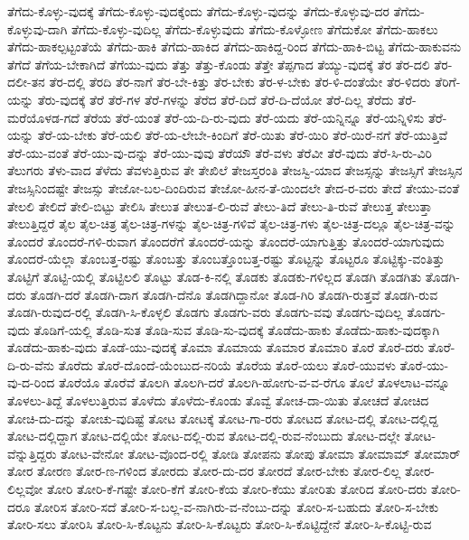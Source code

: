 {ತೆಗೆದು-ಕೊಳ್ಳು-ವುದಕ್ಕೆ
ತೆಗೆದು-ಕೊಳ್ಳು-ವುದಕ್ಕೆಂದು
ತೆಗೆದು-ಕೊಳ್ಳು-ವುದನ್ನು
ತೆಗೆದು-ಕೊಳ್ಳುವು-ದರ
ತೆಗೆದು-ಕೊಳ್ಳುವು-ದಾಗಿ
ತೆಗೆದು-ಕೊಳ್ಳು-ವುದಿಲ್ಲ
ತೆಗೆದು-ಕೊಳ್ಳುವುದು
ತೆಗೆದು-ಕೊಳ್ಳೋಣ
ತೆಗೆದುಕೋ
ತೆಗೆದು-ಹಾಕಲು
ತೆಗೆದು-ಹಾಕಲ್ಪಟ್ಟಂತೆಯೆ
ತೆಗೆದು-ಹಾಕಿ
ತೆಗೆದು-ಹಾಕಿದ
ತೆಗೆದು-ಹಾಕಿದ್ದ-ರಿಂದ
ತೆಗೆದು-ಹಾಕಿ-ಬಿಟ್ಟ
ತೆಗೆದು-ಹಾಕುವನು
ತೆಗೆದೆ
ತೆಗೆಯ-ಬೇಕಾಗಿದೆ
ತೆಗೆಯು-ವುದು
ತೆತ್ತು
ತೆತ್ತು-ಕೊಂಡು
ತೆತ್ತೇ
ತೆಪ್ಪಗಾದ
ತೆಯ್ಯು-ವುದಕ್ಕೆ
ತೆರ
ತೆರ-ದಲಿ
ತೆರ-ದಲೀ-ತನ
ತೆರ-ದಲ್ಲಿ
ತೆರದಿ
ತೆರ-ನಾಗೆ
ತೆರ-ಬೇ-ಕಿತ್ತು
ತೆರ-ಬೇಕು
ತೆರ-ಳ-ಬೇಕು
ತೆರ-ಳಿ-ದಂತೆಯೇ
ತೆರ-ಳಿದರು
ತೆರಿಗೆ-ಯನ್ನು
ತೆರು-ವುದಕ್ಕೆ
ತೆರೆ
ತೆರೆ-ಗಳ
ತೆರೆ-ಗಳನ್ನು
ತೆರೆದ
ತೆರೆ-ದಿದೆ
ತೆರೆ-ದಿ-ದೆಯೋ
ತೆರೆ-ದಿಲ್ಲ
ತೆರೆದು
ತೆರೆ-ಮರೆಯೊಳಡ-ಗದೆ
ತೆರೆಯ
ತೆರೆ-ಯಂತೆ
ತೆರೆ-ಯ-ದಿ-ರು-ವುದು
ತೆರೆ-ಯದು
ತೆರೆ-ಯನ್ನಿನ್ನೂ
ತೆರೆ-ಯನ್ನಿಳಿಸು
ತೆರೆ-ಯನ್ನು
ತೆರೆ-ಯ-ಬೇಕು
ತೆರೆ-ಯಲಿ
ತೆರೆ-ಯ-ಲೇಬೇ-ಕಿಂದಿಗೆ
ತೆರೆ-ಯಿತು
ತೆರೆ-ಯಿರಿ
ತೆರೆ-ಯಿರೆ-ನಗೆ
ತೆರೆ-ಯುತ್ತಿವೆ
ತೆರೆ-ಯು-ವಂತೆ
ತೆರೆ-ಯು-ವು-ದನ್ನು
ತೆರೆ-ಯು-ವುವು
ತೆರೆಯೌ
ತೆರೆ-ವಳು
ತೆರೆವೀ
ತೆರೆ-ವುದು
ತೆರೆ-ಸಿ-ರು-ವಿರಿ
ತೆಲುಗರು
ತೆಳು-ವಾದ
ತೆಳೆದು
ತೆವಳುತ್ತಿರುವ
ತೇ
ತೇಖಿಲೆ
ತೇಜಸ್ತರಂತಿ
ತೇಜಸ್ವಿ-ಯಾದ
ತೇಜಸ್ಸನ್ನು
ತೇಜಸ್ಸಿಗೆ
ತೇಜಸ್ಸಿನ
ತೇಜಸ್ಸಿನಿಂದಷ್ಟೇ
ತೇಜಸ್ಸು
ತೇಜೋ-ಬಲ-ದಿಂದಿರುವ
ತೇಜೋ-ಹೀನ-ತೆ-ಯಿಂದಲೇ
ತೇದ-ರ-ವರು
ತೇದೆ
ತೇಯು-ವಂತೆ
ತೇಲಲಿ
ತೇಲಿದೆ
ತೇಲಿ-ಬಿಟ್ಟು
ತೇಲಿಸಿ
ತೇಲುತ
ತೇಲುತ-ಲಿ-ರುವೆ
ತೇಲು-ತಿದೆ
ತೇಲು-ತಿ-ರುವೆ
ತೇಲುತ್ತ
ತೇಲುತ್ತಾ
ತೇಲುತ್ತಿದ್ದರೆ
ತೈಲ
ತೈಲ-ಚಿತ್ರ
ತೈಲ-ಚಿತ್ರ-ಗಳನ್ನು
ತೈಲ-ಚಿತ್ರ-ಗಳಿವೆ
ತೈಲ-ಚಿತ್ರ-ಗಳು
ತೈಲ-ಚಿತ್ರ-ದಲ್ಲೂ
ತೈಲ-ಚಿತ್ರ-ವನ್ನು
ತೊಂದರೆ
ತೊಂದರೆ-ಗಳಿ-ರುವಾಗ
ತೊಂದರೆಗೆ
ತೊಂದರೆ-ಯನ್ನು
ತೊಂದರೆ-ಯಾಗುತ್ತಿತ್ತು
ತೊಂದರೆ-ಯಾಗುವುದು
ತೊಂದರೆ-ಯೆಲ್ಲಾ
ತೊಂಬತ್ತ-ರಷ್ಟು
ತೊಂಬತ್ತು
ತೊಂಬತ್ತೊಂಬತ್ತ-ರಷ್ಟು
ತೊಟ್ಟನ್ನು
ತೊಟ್ಟರೂ
ತೊಟ್ಟಿಕ್ಕು-ವಂತಿತ್ತು
ತೊಟ್ಟಿಗೆ
ತೊಟ್ಟಿ-ಯಲ್ಲಿ
ತೊಟ್ಟಿಲಲಿ
ತೊಟ್ಟು
ತೊಡ-ಕಿ-ನಲ್ಲಿ
ತೊಡಕು
ತೊಡಕು-ಗಳಿಲ್ಲದ
ತೊಡಗಿ
ತೊಡಗಿತು
ತೊಡಗಿ-ದರು
ತೊಡಗಿ-ದರೆ
ತೊಡಗಿ-ದಾಗ
ತೊಡಗಿ-ದೆನೊ
ತೊಡಗಿದ್ದಾನೋ
ತೊಡ-ಗಿರಿ
ತೊಡಗಿ-ರುತ್ತವೆ
ತೊಡಗಿ-ರುವ
ತೊಡಗಿ-ರುವುದ-ರಲ್ಲಿ
ತೊಡಗಿ-ಸಿ-ಕೊಳ್ಳಲಿ
ತೊಡಗು
ತೊಡಗು-ವರು
ತೊಡಗು-ವವು
ತೊಡಗು-ವುದಿಲ್ಲ
ತೊಡಗು-ವುದು
ತೊಡಿಗೆ-ಯಲ್ಲಿ
ತೊಡಿ-ಸುತ
ತೊಡಿ-ಸುವ
ತೊಡಿ-ಸು-ವುದಕ್ಕೆ
ತೊಡೆದು-ಹಾಕು
ತೊಡೆದು-ಹಾಕು-ವುದಕ್ಕಾಗಿ
ತೊಡೆದು-ಹಾಕು-ವುದು
ತೊಡೆ-ಯು-ವುದಕ್ಕೆ
ತೊಮಾ
ತೊಮಾಯ
ತೊಮಾರ
ತೊಮಾರಿ
ತೊರೆ
ತೊರೆ-ದರು
ತೊರೆ-ದಿ-ರು-ವೆನು
ತೊರೆದು
ತೊರೆ-ದೊಂದೆ-ಯೆಂಬುದ-ನರಿಯೆ
ತೊರೆಯ
ತೊರೆ-ಯಲು
ತೊರೆ-ಯುವಳು
ತೊರೆ-ಯು-ವು-ದ-ರಿಂದ
ತೊರೆಯೊ
ತೊರೆವೆ
ತೊಲಗಿ
ತೊಲಗಿ-ದರೆ
ತೊಲಗಿ-ಹೋಗು-ವ-ವ-ರೆಗೂ
ತೊಲೆ
ತೊಳಲಾಟ-ವನ್ನೂ
ತೊಳಲು-ತಿದ್ದೆ
ತೊಳಲುತ್ತಿರುವ
ತೊಳೆದು
ತೊಳೆದು-ಕೊಂಡು
ತೊವ್ವೆ
ತೋಚ-ದಾ-ಯಿತು
ತೋಚದೆ
ತೋಚಿದ
ತೋಚಿ-ದು-ದನ್ನು
ತೋಚು-ವುದಿಷ್ಟೆ
ತೋಟ
ತೋಟಕ್ಕೆ
ತೋಟ-ಗಾ-ರರು
ತೋಟದ
ತೋಟ-ದಲ್ಲಿ
ತೋಟ-ದಲ್ಲಿದ್ದ
ತೋಟ-ದಲ್ಲಿದ್ದಾಗ
ತೋಟ-ದಲ್ಲಿಯೇ
ತೋಟ-ದಲ್ಲಿ-ರುವ
ತೋಟ-ದಲ್ಲಿ-ರುವ-ನೆಂಬುದು
ತೋಟ-ದಲ್ಲೇ
ತೋಟ-ವೆನ್ನುತ್ತಿದ್ದರು
ತೋಟ-ವೇನೋ
ತೋಟ-ವೊಂದ-ರಲ್ಲಿ
ತೋಡಿ
ತೋಪನು
ತೋಪು
ತೋಮಾ
ತೋಮಾಮ್
ತೋಮಾರ್
ತೋರ
ತೋರಣ
ತೋರ-ಣ-ಗಳಿಂದ
ತೋರದು
ತೋರ-ದು-ದರ
ತೋರದೆ
ತೋರ-ಬೇಕು
ತೋರ-ಲಿಲ್ಲ
ತೋರ-ಲಿಲ್ಲವೋ
ತೋರಿ
ತೋರಿ-ಕೆ-ಗಷ್ಟೇ
ತೋರಿ-ಕೆಗೆ
ತೋರಿ-ಕೆಯ
ತೋರಿ-ಕೆಯು
ತೋರಿತು
ತೋರಿದ
ತೋರಿ-ದರು
ತೋರಿ-ದರೂ
ತೋರಿಸ
ತೋರಿ-ಸದೆ
ತೋರಿ-ಸ-ಬಲ್ಲ-ವ-ನಾಗಿರು-ವ-ನೆಂಬು-ದನ್ನು
ತೋರಿ-ಸ-ಬಹುದು
ತೋರಿ-ಸ-ಬೇಕು
ತೋರಿ-ಸಲು
ತೋರಿಸಿ
ತೋರಿ-ಸಿ-ಕೊಟ್ಟನು
ತೋರಿ-ಸಿ-ಕೊಟ್ಟರು
ತೋರಿ-ಸಿ-ಕೊಟ್ಟಿದ್ದೇನೆ
ತೋರಿ-ಸಿ-ಕೊಟ್ಟಿ-ರುವ
}
